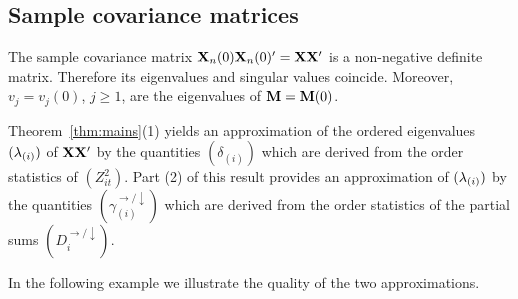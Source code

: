 \subsection{Sample covariance matrices}\label{sec:samplecov}%
The sample covariance matrix ${\mathbf X}_n(0){\mathbf X}_n(0)'={\mathbf X}{\mathbf X}'$ is a non-negative definite matrix. Therefore
its eigenvalues and singular values coincide.  Moreover, $v_j=v_j(0)$, $j\ge 1$, are the eigenvalues of ${\mathbf M}={\mathbf M}(0)$.
\par
Theorem~\ref{thm:mains}(1) yields an approximation of the ordered eigenvalues $(\lambda_{(i)})$ of ${\mathbf X}{\mathbf X}'$ by
the quantities $(\delta_{(i)})$ which are derived from the order statistics of $(Z_{it}^2)$.
Part (2) of this result provides an approximation of $(\lambda_{(i)})$ by the quantities
$(\gamma_{(i)}^{\rightarrow/\downarrow})$ which are derived from the order statistics
of the partial sums $(D_i^{\rightarrow/\downarrow})$.
\par
In the following example we illustrate the
quality of the two approximations.
